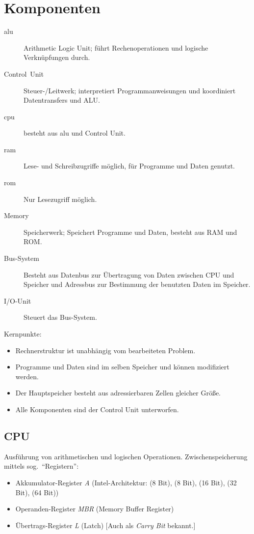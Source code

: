 \section{Komponenten}
\begin{description}
  \item [\gls{alu}] 
	Arithmetic Logic Unit; führt Rechenoperationen und logische Ver\-knüpf\-ung\-en durch.
  \item [{Control~Unit}] 
	Steuer-/Leitwerk; interpretiert Programmanweisungen und koordiniert Datentransfers und ALU.
  \item [\gls{cpu}] 
	besteht aus \gls{alu} und Control Unit.
  \item [\gls{ram}] 
	Lese- und Schreibzugriffe möglich, für Programme und Daten genutzt.
  \item [\gls{rom}] 
	Nur Lesezugriff möglich.
  \item [{Memory}] 
	Speicherwerk; Speichert Programme und Daten, besteht aus RAM und ROM.
  \item [{Bus-System}] 
	Besteht aus Datenbus zur Übertragung von Daten zwischen CPU und Speicher und Adressbus zur Bestimmung der benutzten Daten im Speicher.
  \item [{I/O-Unit}] 
	Steuert das Bus-System.
\end{description}

Kernpunkte:
\begin{itemize}
  \item Rechnerstruktur ist unabhängig vom bearbeiteten Problem.
  \item Programme und Daten sind im selben Speicher und können modifiziert werden.
  \item Der Hauptspeicher besteht aus adressierbaren Zellen gleicher Größe.
  \item Alle Komponenten sind der \foreignlanguage{english}{Control Unit} unterworfen.
\end{itemize}

\subsection{CPU}

Ausführung von arithmetischen und logischen Operationen. Zwischenspeicherung mittels sog.~\enquote{Registern}:
\begin{itemize}
  \item {}
	Akkumulator-Register \emph{A} (Intel-Architektur:  (8 Bit),  (8 Bit),  (16 Bit),  (32 Bit),  (64 Bit))
  \item Operanden-Register \emph{MBR} (\foreignlanguage{english}{Memory Buffer Register})
  \item {}
	Übertrags-Register \emph{L} (\mbox{Latch})
	[Auch als \foreignlanguage{english}{\emph{Carry Bit}} bekannt.]
\end{itemize}

